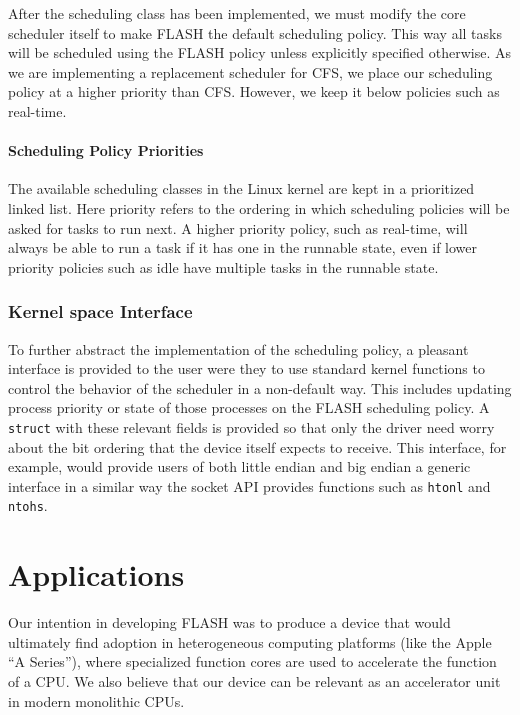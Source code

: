 \documentclass{sig-alternate-10pt}
\begin{document}
After the scheduling class has been implemented, we must modify the core
scheduler itself to make FLASH the default scheduling policy.  This way all
tasks will be scheduled using the FLASH policy unless explicitly specified
otherwise.  As we are implementing a replacement scheduler for CFS, we place
our scheduling policy at a higher priority than CFS.  However, we keep it
below policies such as real-time.

\paragraph{Scheduling Policy Priorities}
The available scheduling classes in the Linux kernel are kept in
a prioritized linked list.  Here priority refers to the ordering in which
scheduling policies will be asked for tasks to run next.  A higher
priority policy, such as real-time, will always be able to run a task if it
has one in the runnable state, even if lower priority policies such as idle
have multiple tasks in the runnable state.

\subsubsection{Kernel space Interface}
To further abstract the implementation of the scheduling policy, a pleasant
interface is provided to the user were they to use standard kernel
functions to control the behavior of the scheduler in a non-default way.
This includes updating process priority or state of those processes on the
FLASH scheduling policy.  A \texttt{struct} with these relevant fields is
provided so that only the driver need worry about the bit ordering that the
device itself expects to receive.  This interface, for example, would
provide users of both little endian and big endian a generic interface in
a similar way the socket API provides functions such as \texttt{htonl} and
\texttt{ntohs}.


\section{Applications}
\label{sec:apps}
Our intention in developing FLASH was to produce a device that would ultimately find adoption in heterogeneous computing platforms (like the Apple ``A Series''), where specialized function cores are used to accelerate the function of a CPU. We also believe that our device can be relevant as an accelerator unit in modern monolithic CPUs.
\end{document}
